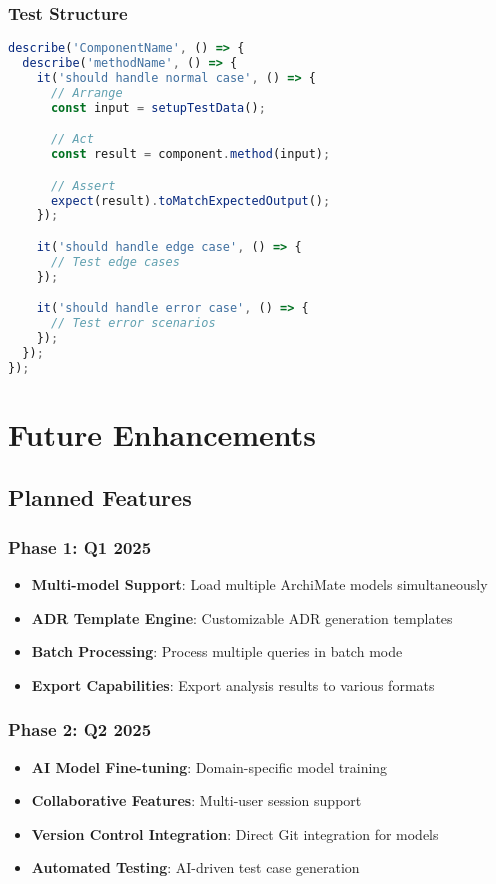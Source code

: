 \documentclass[12pt,a4paper]{report}
\begin{document}
\subsection{Test Structure}

\begin{lstlisting}[language=TypeScript, caption=Test Organization]
describe('ComponentName', () => {
  describe('methodName', () => {
    it('should handle normal case', () => {
      // Arrange
      const input = setupTestData();

      // Act
      const result = component.method(input);

      // Assert
      expect(result).toMatchExpectedOutput();
    });

    it('should handle edge case', () => {
      // Test edge cases
    });

    it('should handle error case', () => {
      // Test error scenarios
    });
  });
});
\end{lstlisting}

\chapter{Future Enhancements}

\section{Planned Features}

\subsection{Phase 1: Q1 2025}
\begin{itemize}
    \item \textbf{Multi-model Support}: Load multiple ArchiMate models simultaneously
    \item \textbf{ADR Template Engine}: Customizable ADR generation templates
    \item \textbf{Batch Processing}: Process multiple queries in batch mode
    \item \textbf{Export Capabilities}: Export analysis results to various formats
\end{itemize}

\subsection{Phase 2: Q2 2025}
\begin{itemize}
    \item \textbf{AI Model Fine-tuning}: Domain-specific model training
    \item \textbf{Collaborative Features}: Multi-user session support
    \item \textbf{Version Control Integration}: Direct Git integration for models
    \item \textbf{Automated Testing}: AI-driven test case generation
\end{itemize}
\end{document}
